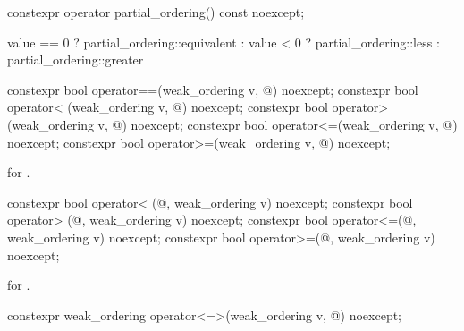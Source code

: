 %
\begin{itemdecl}
constexpr operator partial_ordering() const noexcept;
\end{itemdecl}

\begin{itemdescr}
\pnum
\returns
\begin{codeblock}
value == 0 ? partial_ordering::equivalent :
value < 0  ? partial_ordering::less :
             partial_ordering::greater
\end{codeblock}
\end{itemdescr}

%
%
%
%
%
\begin{itemdecl}
constexpr bool operator==(weak_ordering v, @\unspec@) noexcept;
constexpr bool operator< (weak_ordering v, @\unspec@) noexcept;
constexpr bool operator> (weak_ordering v, @\unspec@) noexcept;
constexpr bool operator<=(weak_ordering v, @\unspec@) noexcept;
constexpr bool operator>=(weak_ordering v, @\unspec@) noexcept;
\end{itemdecl}

\begin{itemdescr}
\pnum
\returns
{} for .
\end{itemdescr}

%
%
%
%
\begin{itemdecl}
constexpr bool operator< (@\unspec@, weak_ordering v) noexcept;
constexpr bool operator> (@\unspec@, weak_ordering v) noexcept;
constexpr bool operator<=(@\unspec@, weak_ordering v) noexcept;
constexpr bool operator>=(@\unspec@, weak_ordering v) noexcept;
\end{itemdecl}

\begin{itemdescr}
\pnum
\returns
{} for .
\end{itemdescr}

%
\begin{itemdecl}
constexpr weak_ordering operator<=>(weak_ordering v, @\unspec@) noexcept;
\end{itemdecl}

